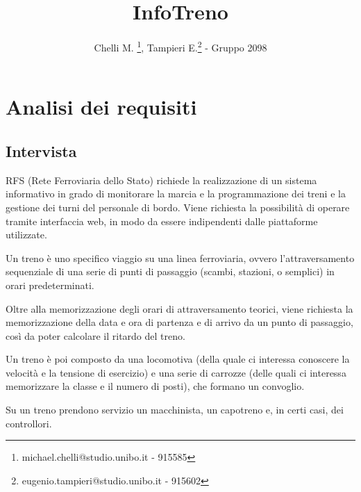 \documentclass[a4paper,12pt]{report}
\title{InfoTreno}
\author{Chelli M. \thanks{michael.chelli@studio.unibo.it - 915585}, Tampieri E.\thanks{eugenio.tampieri@studio.unibo.it - 915602} - Gruppo 2098}
\begin{document}
	\maketitle
	\tableofcontents
	\chapter{Analisi dei requisiti}
	\section{Intervista}
	\par RFS (Rete Ferroviaria dello Stato) richiede la realizzazione di un sistema informativo in grado di monitorare la marcia e la programmazione dei treni e la gestione dei turni del personale di bordo. Viene richiesta la possibilità di operare tramite interfaccia web, in modo da essere indipendenti dalle piattaforme utilizzate.
	\par Un treno è uno specifico viaggio su una linea ferroviaria, ovvero l'attraversamento sequenziale di una serie di punti di passaggio (scambi, stazioni, o semplici) in orari predeterminati.
	\par Oltre alla memorizzazione degli orari di attraversamento teorici, viene richiesta la memorizzazione della data e ora di partenza e di arrivo da un punto di passaggio, così da poter calcolare il ritardo del treno.
	\par Un treno è poi composto da una locomotiva (della quale ci interessa conoscere la velocità e la tensione di esercizio) e una serie di carrozze (delle quali ci interessa memorizzare la classe e il numero di posti), che formano un convoglio.
	\par Su un treno prendono servizio un macchinista, un capotreno e, in certi casi, dei controllori.
\end{document}
